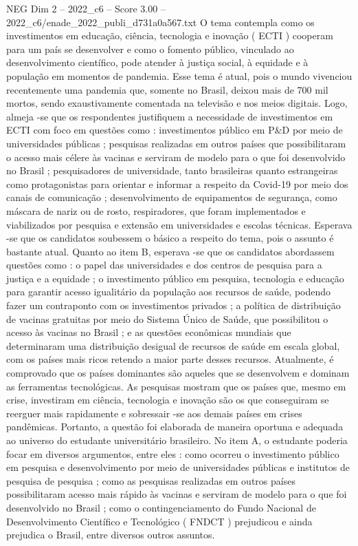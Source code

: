 \begin{textsample}{NEG Dim 2 – 2022\_c6 – Score 3.00 – 2022\_c6/enade\_2022\_publi\_d731a0a567.txt}
O tema contempla como os investimentos em educação, ciência, tecnologia e inovação ( ECTI ) cooperam para um país se desenvolver e como o fomento público, vinculado ao desenvolvimento científico, pode atender à justiça social, à equidade e à população em momentos de pandemia.
Esse tema é atual, pois o mundo vivenciou recentemente uma pandemia que, somente no Brasil, deixou mais de 700 mil mortos, sendo exaustivamente comentada na televisão e nos meios digitais.
Logo, almeja -se que os respondentes justifiquem a necessidade de investimentos em ECTI com foco em questões como : investimentos público em P\&D por meio de universidades públicas ; pesquisas realizadas em outros países que possibilitaram o acesso mais célere às vacinas e serviram de modelo para o que foi desenvolvido no Brasil ; pesquisadores de universidade, tanto brasileiras quanto estrangeiras como protagonistas para orientar e informar a respeito da Covid-19 por meio dos canais de comunicação ; desenvolvimento de equipamentos de segurança, como máscara de nariz ou de rosto, respiradores, que foram implementados e viabilizados por pesquisa e extensão em universidades e escolas técnicas.
Esperava -se que os candidatos soubessem o básico a respeito do tema, pois o assunto é bastante atual.
Quanto ao item B, esperava -se que os candidatos abordassem questões como : o papel das universidades e dos centros de pesquisa para a justiça e a equidade ; o investimento público em pesquisa, tecnologia e educação para garantir acesso igualitário da população aos recursos de saúde, podendo fazer um contraponto com os investimentos privados ; a política de distribuição de vacinas gratuitas por meio do Sistema Único de Saúde, que possibilitou o acesso às vacinas no Brasil ; e as questões econômicas mundiais que determinaram uma distribuição desigual de recursos de saúde em escala global, com os países mais ricos retendo a maior parte desses recursos.
Atualmente, é comprovado que os países dominantes são aqueles que se desenvolvem e dominam as ferramentas tecnológicas.
As pesquisas mostram que os países que, mesmo em crise, investiram em ciência, tecnologia e inovação são os que conseguiram se reerguer mais rapidamente e sobressair -se aos demais países em crises pandêmicas.
Portanto, a questão foi elaborada de maneira oportuna e adequada ao universo do estudante universitário brasileiro.
No item A, o estudante poderia focar em diversos argumentos, entre eles : como ocorreu o investimento público em pesquisa e desenvolvimento por meio de universidades públicas e institutos de pesquisa de pesquisa ; como as pesquisas realizadas em outros países possibilitaram acesso mais rápido às vacinas e serviram de modelo para o que foi desenvolvido no Brasil ; como o contingenciamento do Fundo Nacional de Desenvolvimento Científico e Tecnológico ( FNDCT ) prejudicou e ainda prejudica o Brasil, entre diversos outros assuntos.

\end{textsample}
